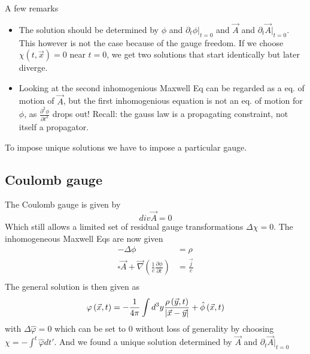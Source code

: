 \documentclass{report}
\begin{document}
A few remarks
\begin{itemize}
  \item The solution should be determined by $\phi$ and $\partial_t \phi|_{t=0} $ and $\vec{A}$ and $\partial_t \vec{A}|_{t=0} $. This however is not the case because of the gauge freedom. If we choose $\chi\left( t, \vec{x} \right) =0$ near $t=0$, we get two solutions that start identically but later diverge.
  \item Looking at the second inhomogenious Maxwell Eq can be regarded as a eq. of motion of $\vec{A}$, but the first inhomogenious equation is not an eq. of motion for $\phi$, as $\frac{\partial^2 \phi }{\partial t^2}$ drops out! Recall: the gauss law is a propagating constraint, not itself a propagator.
\end{itemize}
To impose unique solutions we have to impose a particular gauge.
\subsection{Coulomb gauge}
The Coulomb gauge is given by \[
div \vec{A} = 0
\] 
Which still allows a limited set of residual gauge transformations $\Delta \chi = 0$.
The inhomogeneous Maxwell Eqs are now given
\begin{align*}
  - \Delta\phi &=  \rho \\
  \square \vec{A} + \vec{\nabla }\left( \frac{1}{c} \frac{\partial \phi}{\partial t} \right) &= \frac{\vec{j}}{c}\\
\end{align*}
The general solution is then given as
\begin{align*}
  \varphi\left( \vec{x},t \right)  &= -\frac{1}{4 \pi} \int d^{3} y \frac{\rho\left( \vec{y},t \right) }{\abs{\vec{x} - \vec{y}}} + \hat{\phi}\left( \vec{x},t \right) \\
\end{align*}
with $\Delta \hat{\varphi} = 0$ which can be set to $0$ without loss of generality by choosing $\chi = - \int^t \hat{\varphi} dt' $. And we found a unique solution determined by $\vec{A}$ and $\partial_t \vec{A}|_{t=0} $
\end{document}
